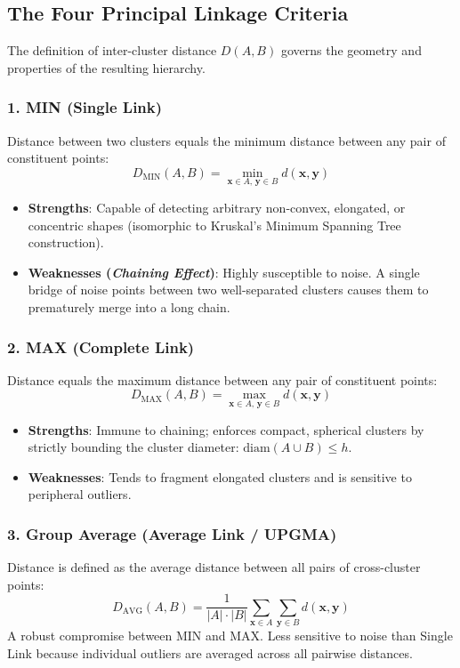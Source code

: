 \subsection{The Four Principal Linkage Criteria}

The definition of inter-cluster distance $D(A, B)$ governs the geometry and properties of the resulting hierarchy.

\subsubsection{1. MIN (Single Link)}
Distance between two clusters equals the minimum distance between any pair of constituent points:
\begin{equation}
    D_{\text{MIN}}(A, B) = \min_{\mathbf{x} \in A, \, \mathbf{y} \in B} d(\mathbf{x}, \mathbf{y})
    \label{eq:dm-single-link-en}
\end{equation}
\begin{itemize}[noitemsep]
    \item \textbf{Strengths}: Capable of detecting arbitrary non-convex, elongated, or concentric shapes (isomorphic to Kruskal's Minimum Spanning Tree construction).
    \item \textbf{Weaknesses (\textit{Chaining Effect})}: Highly susceptible to noise. A single bridge of noise points between two well-separated clusters causes them to prematurely merge into a long chain.
\end{itemize}

\subsubsection{2. MAX (Complete Link)}
Distance equals the maximum distance between any pair of constituent points:
\begin{equation}
    D_{\text{MAX}}(A, B) = \max_{\mathbf{x} \in A, \, \mathbf{y} \in B} d(\mathbf{x}, \mathbf{y})
    \label{eq:dm-complete-link-en}
\end{equation}
\begin{itemize}[noitemsep]
    \item \textbf{Strengths}: Immune to chaining; enforces compact, spherical clusters by strictly bounding the cluster diameter: $\text{diam}(A \cup B) \le h$.
    \item \textbf{Weaknesses}: Tends to fragment elongated clusters and is sensitive to peripheral outliers.
\end{itemize}

\subsubsection{3. Group Average (Average Link / UPGMA)}
Distance is defined as the average distance between all pairs of cross-cluster points:
\begin{equation}
    D_{\text{AVG}}(A, B) = \frac{1}{|A| \cdot |B|} \sum_{\mathbf{x} \in A} \sum_{\mathbf{y} \in B} d(\mathbf{x}, \mathbf{y})
    \label{eq:dm-average-link-en}
\end{equation}
A robust compromise between MIN and MAX. Less sensitive to noise than Single Link because individual outliers are averaged across all pairwise distances.

